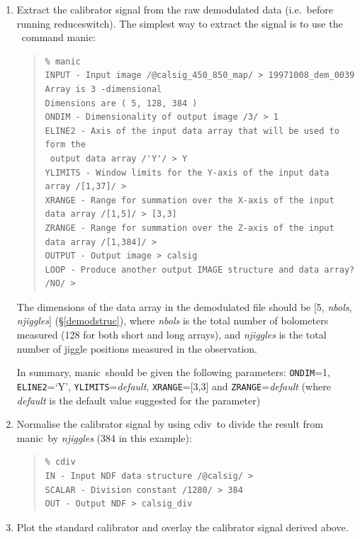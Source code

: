 \documentclass[twoside,11pt]{article}
\newcommand{\Kappa}{\xref{{\sc{Kappa}}}{sun95}{}}
\newcommand{\task}[1]{{\sf #1}}
\newcommand{\param}[1]{{\tt #1}}
\newcommand{\resw}{\htmlref{\task{reduce\_switch}}{REDUCE_SWITCH}}
\newcommand{\manic}{\xref{\task{manic}}{sun95}{MANIC}}
\newcommand{\cdiv}{\xref{\task{cdiv}}{sun95}{CDIV}}
\newenvironment{myquote}{\begin{quote}\begin{small}}{\end{small}\end{quote}}
\newcommand{\htmlref}[2]{#1}
\newcommand{\xref}[3]{#1}
\renewcommand{\_}{\texttt{\symbol{95}}}
\begin{document}
\begin{enumerate}

\item Extract the calibrator signal from the raw demodulated data (i.e.\
before running \resw). The simplest way to extract the signal is to use
the \Kappa\ command \manic:

\begin{myquote}
\begin{verbatim}
% manic
INPUT - Input image /@calsig_450_850_map/ > 19971008_dem_0039
Array is 3 -dimensional
Dimensions are ( 5, 128, 384 )
ONDIM - Dimensionality of output image /3/ > 1
ELINE2 - Axis of the input data array that will be used to form the 
 output data array /'Y'/ > Y
YLIMITS - Window limits for the Y-axis of the input data array /[1,37]/ > 
XRANGE - Range for summation over the X-axis of the input data array /[1,5]/ > [3,3]
ZRANGE - Range for summation over the Z-axis of the input data array /[1,384]/ > 
OUTPUT - Output image > calsig
LOOP - Produce another output IMAGE structure and data array? /NO/ > 
\end{verbatim}
\end{myquote}

The dimensions of the data array in the demodulated file should be [5,
\textit{n\_bols}, \textit{n\_jiggles}] (\S\ref{demodstruc}), where
\textit{n\_bols} is the total number of bolometers measured (128 for both
short and long arrays), and \textit{n\_jiggles} is the total number of jiggle
positions measured in the observation.

In summary, \manic\ should be given the following parameters: \param{ONDIM}=1,
\param{ELINE2}=`Y', \param{YLIMITS}=\textit{default}, \param{XRANGE}=[3,3] and
\param{ZRANGE}=\textit{default} 
(where \textit{default} is the default value suggested for the parameter)


\item Normalise the calibrator signal by using \cdiv\ to divide the result
from \manic\ by \textit{n\_jiggles} (384 in this example):

\begin{myquote}
\begin{verbatim}
% cdiv
IN - Input NDF data structure /@calsig/ > 
SCALAR - Division constant /1280/ > 384
OUT - Output NDF > calsig_div
\end{verbatim}
\end{myquote}

\item Plot the standard calibrator and overlay the calibrator signal derived
above. 


\end{enumerate}
\end{document}
